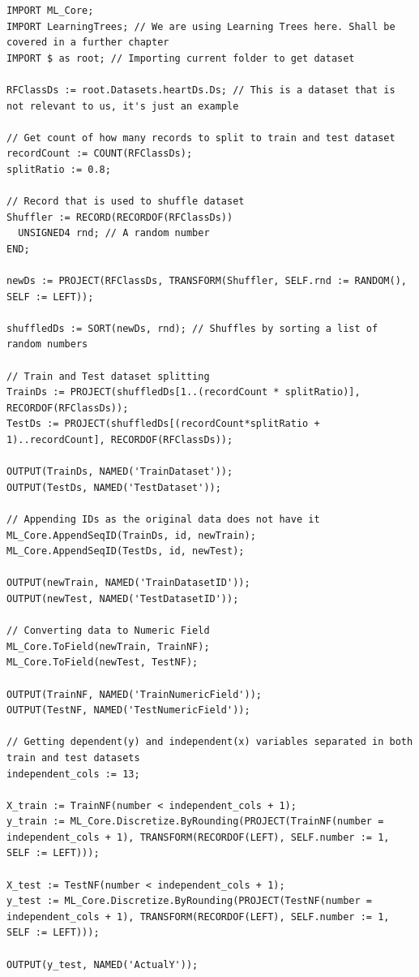 \documentclass[a4paper,oneside,12pt]{book}
\begin{document}
\begin{lstlisting}
IMPORT ML_Core;
IMPORT LearningTrees; // We are using Learning Trees here. Shall be covered in a further chapter
IMPORT $ as root; // Importing current folder to get dataset

RFClassDs := root.Datasets.heartDs.Ds; // This is a dataset that is not relevant to us, it's just an example

// Get count of how many records to split to train and test dataset
recordCount := COUNT(RFClassDs);
splitRatio := 0.8;

// Record that is used to shuffle dataset
Shuffler := RECORD(RECORDOF(RFClassDs))
  UNSIGNED4 rnd; // A random number
END;

newDs := PROJECT(RFClassDs, TRANSFORM(Shuffler, SELF.rnd := RANDOM(), SELF := LEFT)); 

shuffledDs := SORT(newDs, rnd); // Shuffles by sorting a list of random numbers

// Train and Test dataset splitting
TrainDs := PROJECT(shuffledDs[1..(recordCount * splitRatio)], RECORDOF(RFClassDs));
TestDs := PROJECT(shuffledDs[(recordCount*splitRatio + 1)..recordCount], RECORDOF(RFClassDs));

OUTPUT(TrainDs, NAMED('TrainDataset'));
OUTPUT(TestDs, NAMED('TestDataset'));

// Appending IDs as the original data does not have it
ML_Core.AppendSeqID(TrainDs, id, newTrain);
ML_Core.AppendSeqID(TestDs, id, newTest);

OUTPUT(newTrain, NAMED('TrainDatasetID'));
OUTPUT(newTest, NAMED('TestDatasetID'));

// Converting data to Numeric Field
ML_Core.ToField(newTrain, TrainNF);
ML_Core.ToField(newTest, TestNF);

OUTPUT(TrainNF, NAMED('TrainNumericField'));
OUTPUT(TestNF, NAMED('TestNumericField'));

// Getting dependent(y) and independent(x) variables separated in both train and test datasets
independent_cols := 13;

X_train := TrainNF(number < independent_cols + 1);
y_train := ML_Core.Discretize.ByRounding(PROJECT(TrainNF(number = independent_cols + 1), TRANSFORM(RECORDOF(LEFT), SELF.number := 1, SELF := LEFT)));

X_test := TestNF(number < independent_cols + 1);
y_test := ML_Core.Discretize.ByRounding(PROJECT(TestNF(number = independent_cols + 1), TRANSFORM(RECORDOF(LEFT), SELF.number := 1, SELF := LEFT)));

OUTPUT(y_test, NAMED('ActualY'));


\end{lstlisting}
\end{document}
